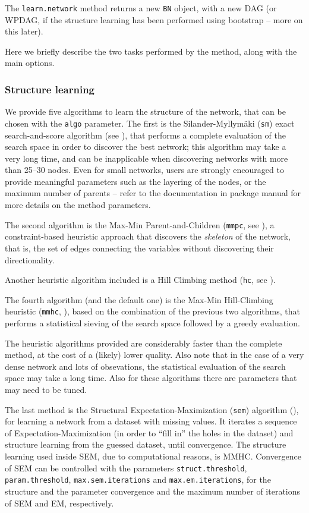 \documentclass{article}\usepackage[]{graphicx}\usepackage[]{color}
\newcommand{\Robject}[1]{{\texttt{#1}}}
\newcommand{\Rmethod}[1]{{\texttt{#1}}}
\newcommand{\Rfunarg}[1]{{\texttt{#1}}}
\begin{document}
The \Rmethod{learn.network} method returns a new \Robject{BN} object, with a new DAG (or WPDAG, if the structure
learning has been performed using bootstrap -- more on this later).

Here we briefly describe the two tasks performed by the method, along with the main options.

\subsubsection{Structure learning}
We provide five algorithms to learn the structure of the network, that can be chosen with the \texttt{algo} parameter.
The first is the Silander-Myllym\"aki (\texttt{sm})
exact search-and-score algorithm (see \citet*{silander2012simple}), that performs a complete evaluation of the search space in order to discover
the best network; this algorithm may take a very long time, and can be inapplicable when discovering networks
with more than 25--30 nodes. Even for small networks, users are strongly encouraged to provide
meaningful parameters such as the layering of the nodes, or the maximum number of parents -- refer to the 
documentation in package manual for more details on the method parameters.

The second algorithm is the Max-Min Parent-and-Children (\texttt{mmpc}, see \citet*{tsamardinos2006max}), a
constraint-based heuristic approach that discovers the \emph{skeleton} of the network, that is, the set of edges
connecting the variables without discovering their directionality.

Another heuristic algorithm included is a Hill Climbing method (\texttt{hc}, see \citet*{tsamardinos2006max}).

The fourth algorithm (and the default one) is the Max-Min Hill-Climbing heuristic (\texttt{mmhc}, \citet*{tsamardinos2006max}),
based on the combination of the previous two algorithms, that performs a statistical
sieving of the search space followed by a greedy evaluation. 

The heuristic algorithms provided are considerably faster than the complete method, at the cost of a (likely)
lower quality. Also note that in the case of a very dense network and lots of obsevations, the statistical evaluation
of the search space may take a long time. Also for these algorithms there are parameters that may need to be tuned.

The last method is the Structural Expectation-Maximization (\texttt{sem}) algorithm (\citet{friedman1997learning,friedman1998bayesian}),
for learning a network from a dataset with missing values. It iterates a sequence of Expectation-Maximization (in order to ``fill in''
the holes in the dataset) and structure learning from the guessed dataset, until convergence. The structure learning used inside SEM,
due to computational reasons, is MMHC. Convergence of SEM can be controlled with the parameters \Rfunarg{struct.threshold},
\Rfunarg{param.threshold}, \Rfunarg{max.sem.iterations} and \Rfunarg{max.em.iterations},
for the structure and the parameter convergence and the maximum number of iterations of SEM and EM, respectively.
\end{document}

